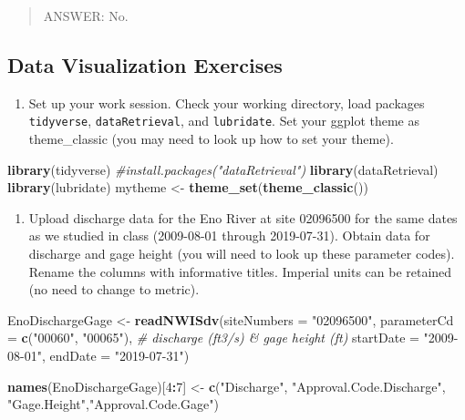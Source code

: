 \documentclass[]{article}
\newenvironment{Shaded}{\begin{snugshade}}{\end{snugshade}}
\newcommand{\CommentTok}[1]{\textcolor[rgb]{0.56,0.35,0.01}{\textit{#1}}}
\newcommand{\DataTypeTok}[1]{\textcolor[rgb]{0.13,0.29,0.53}{#1}}
\newcommand{\DecValTok}[1]{\textcolor[rgb]{0.00,0.00,0.81}{#1}}
\newcommand{\KeywordTok}[1]{\textcolor[rgb]{0.13,0.29,0.53}{\textbf{#1}}}
\newcommand{\NormalTok}[1]{#1}
\newcommand{\OperatorTok}[1]{\textcolor[rgb]{0.81,0.36,0.00}{\textbf{#1}}}
\newcommand{\StringTok}[1]{\textcolor[rgb]{0.31,0.60,0.02}{#1}}
\providecommand{\tightlist}{%
  \setlength{\itemsep}{0pt}\setlength{\parskip}{0pt}}
\begin{document}
\begin{quote}
ANSWER: No.
\end{quote}

\hypertarget{data-visualization-exercises}{%
\subsection{Data Visualization
Exercises}\label{data-visualization-exercises}}

\begin{enumerate}
\def\labelenumi{\arabic{enumi}.}
\setcounter{enumi}{5}
\tightlist
\item
  Set up your work session. Check your working directory, load packages
  \texttt{tidyverse}, \texttt{dataRetrieval}, and \texttt{lubridate}.
  Set your ggplot theme as theme\_classic (you may need to look up how
  to set your theme).
\end{enumerate}

\begin{Shaded}
\begin{Highlighting}[]
\KeywordTok{library}\NormalTok{(tidyverse)}
\CommentTok{#install.packages("dataRetrieval")}
\KeywordTok{library}\NormalTok{(dataRetrieval)}
\KeywordTok{library}\NormalTok{(lubridate)}
\NormalTok{mytheme <-}\StringTok{ }\KeywordTok{theme_set}\NormalTok{(}\KeywordTok{theme_classic}\NormalTok{())}
\end{Highlighting}
\end{Shaded}

\begin{enumerate}
\def\labelenumi{\arabic{enumi}.}
\setcounter{enumi}{6}
\tightlist
\item
  Upload discharge data for the Eno River at site 02096500 for the same
  dates as we studied in class (2009-08-01 through 2019-07-31). Obtain
  data for discharge and gage height (you will need to look up these
  parameter codes). Rename the columns with informative titles. Imperial
  units can be retained (no need to change to metric).
\end{enumerate}

\begin{Shaded}
\begin{Highlighting}[]
\NormalTok{EnoDischargeGage <-}\StringTok{ }\KeywordTok{readNWISdv}\NormalTok{(}\DataTypeTok{siteNumbers =} \StringTok{"02096500"}\NormalTok{,}
                     \DataTypeTok{parameterCd =} \KeywordTok{c}\NormalTok{(}\StringTok{"00060"}\NormalTok{, }\StringTok{"00065"}\NormalTok{), }\CommentTok{# discharge (ft3/s) & gage height (ft)}
                     \DataTypeTok{startDate =} \StringTok{"2009-08-01"}\NormalTok{,}
                     \DataTypeTok{endDate =} \StringTok{"2019-07-31"}\NormalTok{)}

\KeywordTok{names}\NormalTok{(EnoDischargeGage)[}\DecValTok{4}\OperatorTok{:}\DecValTok{7}\NormalTok{] <-}\StringTok{ }\KeywordTok{c}\NormalTok{(}\StringTok{"Discharge"}\NormalTok{, }\StringTok{"Approval.Code.Discharge"}\NormalTok{,}
                              \StringTok{"Gage.Height"}\NormalTok{,}\StringTok{"Approval.Code.Gage"}\NormalTok{)}
\end{Highlighting}
\end{Shaded}
\end{document}

